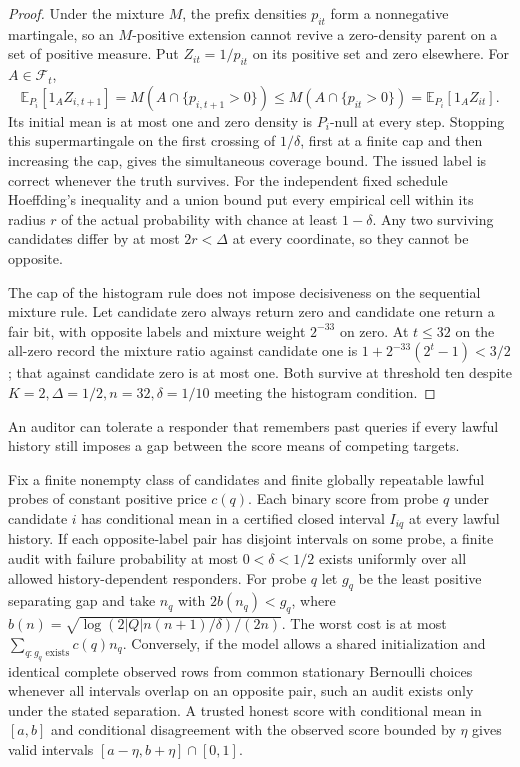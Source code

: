 \begin{proof}

Under the mixture \(M\), the prefix densities \(p_{it}\) form a nonnegative martingale, so an \(M\)-positive extension cannot revive a zero-density parent on a set of positive measure. Put \(Z_{it}=1/p_{it}\) on its positive set and zero elsewhere. For \(A\in\mathcal F_t\),
\[
\mathbb E_{P_i}[1_A Z_{i,t+1}]=M(A\cap\{p_{i,t+1}>0\})
\le M(A\cap\{p_{it}>0\})=\mathbb E_{P_i}[1_A Z_{it}].
\]
Its initial mean is at most one and zero density is \(P_i\)-null at every step. Stopping this supermartingale on the first crossing of \(1/\delta\), first at a finite cap and then increasing the cap, gives the simultaneous coverage bound. The issued label is correct whenever the truth survives. For the independent fixed schedule Hoeffding's inequality and a union bound put every empirical cell within its radius \(r\) of the actual probability with chance at least \(1-\delta\). Any two surviving candidates differ by at most \(2r<\Delta\) at every coordinate, so they cannot be opposite.

The cap of the histogram rule does not impose decisiveness on the sequential mixture rule. Let candidate zero always return zero and candidate one return a fair bit, with opposite labels and mixture weight \(2^{-33}\) on zero. At \(t\le32\) on the all-zero record the mixture ratio against candidate one is \(1+2^{-33}(2^t-1)<3/2\); that against candidate zero is at most one. Both survive at threshold ten despite \(K=2,\Delta=1/2,n=32,\delta=1/10\) meeting the histogram condition.

\end{proof}

An auditor can tolerate a responder that remembers past queries if every lawful history still imposes a gap between the score means of competing targets.

\begin{theorem}\label{thm:t24}

Fix a finite nonempty class of candidates and finite globally repeatable lawful probes of constant positive price \(c(q)\). Each binary score from probe \(q\) under candidate \(i\) has conditional mean in a certified closed interval \(I_{iq}\) at every lawful history. If each opposite-label pair has disjoint intervals on some probe, a finite audit with failure probability at most \(0<\delta<1/2\) exists uniformly over all allowed history-dependent responders. For probe \(q\) let \(g_q\) be the least positive separating gap and take \(n_q\) with \(2b(n_q)<g_q\), where \(b(n)=\sqrt{\log(2|Q|n(n+1)/\delta)/(2n)}\). The worst cost is at most \(\sum_{q:g_q\text{ exists}}c(q)n_q\). Conversely, if the model allows a shared initialization and identical complete observed rows from common stationary Bernoulli choices whenever all intervals overlap on an opposite pair, such an audit exists only under the stated separation. A trusted honest score with conditional mean in \([a,b]\) and conditional disagreement with the observed score bounded by \(\eta\) gives valid intervals \([a-\eta,b+\eta]\cap[0,1]\).

\end{theorem}

